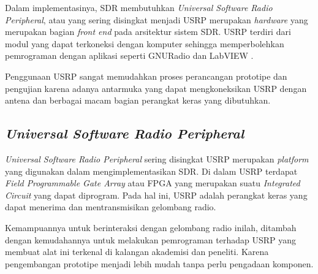 Dalam implementasinya, SDR membutuhkan \textit{Universal Software Radio Peripheral}, atau yang sering disingkat menjadi USRP merupakan \textit{hardware} yang merupakan bagian \textit{front end} pada arsitektur sistem SDR. USRP terdiri dari modul yang dapat terkoneksi dengan komputer sehingga memperbolehkan pemrograman dengan aplikasi seperti GNURadio dan LabVIEW \cite{Gulo2023}. 

Penggunaan USRP sangat memudahkan proses perancangan prototipe dan pengujian karena adanya antarmuka yang dapat mengkoneksikan USRP dengan antena dan berbagai macam bagian perangkat keras yang dibutuhkan.

\subsection{\textit{Universal Software Radio Peripheral}}

\textit{Universal Software Radio Peripheral} sering disingkat USRP merupakan \textit{platform} yang digunakan dalam mengimplementasikan SDR. Di dalam USRP terdapat \textit{Field Programmable Gate Array} atau FPGA yang merupakan suatu \textit{Integrated Circuit} yang dapat diprogram. Pada hal ini, USRP adalah perangkat keras yang dapat menerima dan mentransmisikan gelombang radio.

Kemampuannya untuk berinteraksi dengan gelombang radio inilah, ditambah dengan kemudahannya untuk melakukan pemrograman terhadap USRP yang membuat alat ini terkenal di kalangan akademisi dan peneliti. Karena pengembangan prototipe menjadi lebih mudah tanpa perlu pengadaan komponen.

